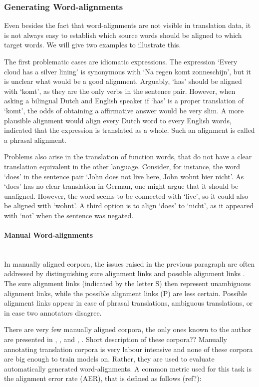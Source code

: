 \documentclass{report}
\newcommand{\myparagraph}[1]{\paragraph{#1}\mbox{}\\}
\theoremstyle{definition}
\theoremstyle{plain}
\begin{document}
\subsubsection{Generating Word-alignments}

Even besides the fact that word-alignments are not visible in translation data, it is not always easy to establish which source words should be aligned to which target words. We will give two examples to illustrate this.

The first problematic cases are idiomatic expressions. The expression `Every cloud has a silver lining'  is synonymous with `Na regen komt zonneschijn', but it is unclear what would be a good alignment. Arguably, `has' should be aligned with `komt', as they are the only verbs in the sentence pair. However, when asking a bilingual Dutch and English speaker if `has' is a proper translation of `komt', the odds of obtaining a affirmative answer would be very slim. A more plausible alignment would align every Dutch word to every English words, indicated that the expression is translated as a whole. Such an alignment is called a phrasal alignment.

Problems also arise in the translation of function words, that do not have a clear translation equivalent in the other language. Consider, for instance, the word `does' in the sentence pair `John does not live here, John wohnt hier nicht'. As `does' has no clear translation in German, one might argue that it should be unaligned. However, the word seems to be connected with `live', so it could also be aligned with `wohnt'. A third option is to align `does' to `nicht', as it appeared with `not' when the sentence was negated.\citep[Example from][p.114]{koehn2008statistical}

\myparagraph{Manual Word-alignments}
In manually aligned corpora, the issues raised in the previous paragraph are often addressed by distinguishing sure alignment links and possible alignment links \citep{lambert2005guidelines}. The sure alignment links (indicated by the letter S) then represent unambiguous alignment links, while the possible alignment links (P) are less certain. Possible alignment links appear in case of phrasal translations, ambiguous translations, or in case two annotators disagree. 

There are very few manually aligned corpora, the only ones known to the author are presented in \cite{och2000improved}, \cite{graca2008building}, \cite{mihalcea2003evaluation} and \cite{pado2006optimal}, \cite{ahrenberg2000evaluation}. Short description of these corpora??
Manually annotating translation corpora is very labour intensive and none of these corpora are big enough to train models on. Rather, they are used to evaluate automatically generated word-alignments. A common metric used for this task is the alignment error rate (AER), that is defined as follows (ref?):
\end{document}
